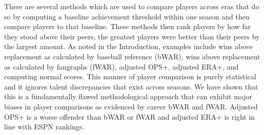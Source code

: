 \documentclass[11pt]{article}\usepackage[]{graphicx}\usepackage[]{color}
\begin{document}
There are several methods which are used to compare players across eras that 
do so by computing a baseline achievement threshold within one season and then 
compare players to that baseline.  These methods then rank players by how far 
they stood above their peers, the greatest players were better than their peers 
by the largest amount. 
As noted in the Introduction, examples include 
wins above replacement as calculated by baseball reference (bWAR), 
wins above replacement as calculated by fangraphs (fWAR), 
adjusted OPS+,
adjusted ERA+,
and computing normal scores.
This manner of player comparison is purely statistical and it ignores talent 
discrepancies that exist across seasons.  We have shown that this is a 
fundamentally flawed methodological approach that can exhibit major biases in 
player comparisons as evidenced by career bWAR and fWAR.  Adjusted OPS+ is a 
worse offender than bWAR or fWAR and adjusted ERA+ is right in line with ESPN 
rankings. 

\end{document}
